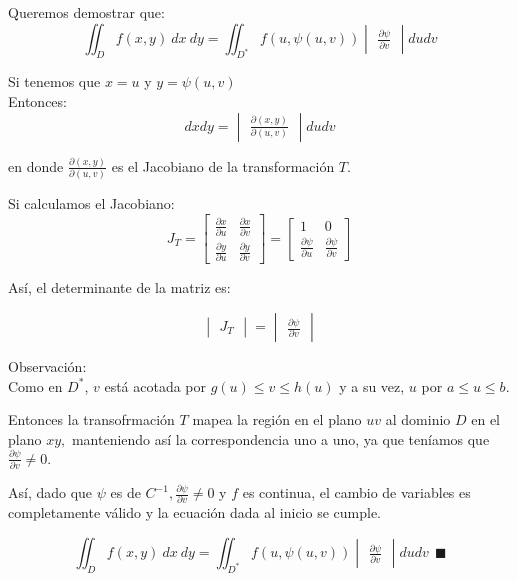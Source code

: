 Queremos demostrar que:
$$\iint_D f(x, y) \ dx \ dy = \iint_{D^*} f(u, \psi(u, v))\begin{vmatrix}
    \frac{\partial \psi}{\partial v}
\end{vmatrix} dudv$$

Si tenemos que $x = u$ y $y = \psi(u, v)$
\\Entonces:
$$dx dy = \begin{vmatrix}
    \frac{\partial(x, y)}{\partial(u, v)}
\end{vmatrix} du dv$$

en donde $\frac{\partial(x, y)}{\partial(u, v)}$ es el Jacobiano de la transformación $T.$

Si calculamos el Jacobiano:
$$J_T = \begin{bmatrix}
    \frac{\partial x}{\partial u} & \frac{\partial x}{\partial v}\\
    \frac{\partial y}{\partial u} & \frac{\partial y}{\partial v}
\end{bmatrix} = \begin{bmatrix}
    1 & 0\\
    \frac{\partial \psi}{\partial u} & \frac{\partial \psi}{\partial v}
\end{bmatrix}$$

Así, el determinante de la matriz es:

$$\begin{vmatrix}
    J_T
\end{vmatrix} = \begin{vmatrix}
    \frac{\partial \psi}{\partial v}
\end{vmatrix}$$

Observación:
\\Como en $D^*$, $v$ está acotada por $g(u) \leq v \leq h(u)$ y a su vez, $u$ por $a \leq u \leq b.$

Entonces la transofrmación $T$ mapea la región en el plano $uv$ al dominio $D$ en el plano $xy,$ manteniendo así la correspondencia uno a uno, ya que teníamos que $\frac{\partial \psi}{\partial v} \neq 0.$

Así, dado que $\psi$ es de $C^{-1}, \frac{\partial \psi}{\partial v} \neq 0$ y $f$ es continua, el cambio de variables es completamente válido y la ecuación dada al inicio se cumple.

$$\iint_D f(x, y) \ dx \ dy = \iint_{D^*} f(u, \psi(u, v))\begin{vmatrix}
    \frac{\partial \psi}{\partial v}
\end{vmatrix} dudv \ \ \blacksquare$$
